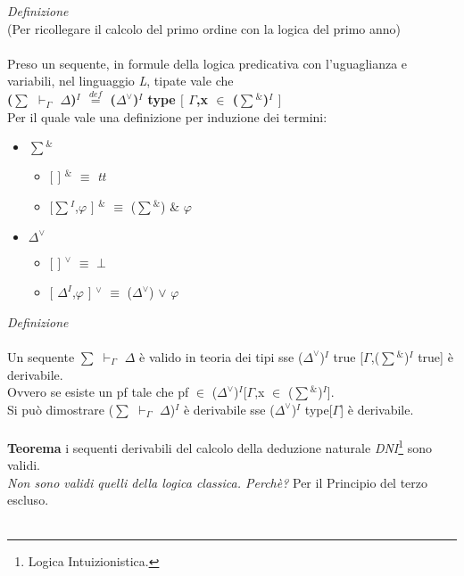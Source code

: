 \noindent \textit{Definizione}\\
(Per ricollegare il calcolo del primo ordine con la logica del primo anno)\\\\
\noindent 
Preso un sequente, in formule della logica predicativa con l'uguaglianza  e variabili, nel linguaggio \textit{L}, tipate vale che\\
\textbf{({\scriptsize$\sum$} $\vdash_\Gamma$ $\Delta$)$^I$ ${\overset{\mathit{def}}{=}}$ ($\Delta^\vee$)$^I$ type $[$ $\Gamma$,x $\in$ ({\scriptsize$\sum$}$^\&$)$^I$ $]$}\\
Per il quale vale una definizione per induzione dei termini:
\begin{itemize}
\item {\scriptsize$\sum$}$^\&$
\begin{itemize}
\item $[$ $]$ $^\&$ $\equiv$ \textit{tt}
\item $[${\scriptsize$\sum$}$^I$,$\varphi$ $]$ $^\&$ $\equiv$ ({\scriptsize$\sum$}$^\&$) \& $\varphi$
\end{itemize}
\item $\Delta^\vee$
\begin{itemize}
\item $[$ $]$ $^\vee$ $\equiv$ \textit{$\bot$}
\item $[$ $\Delta^I$,$\varphi$ $]$ $^\vee$ $\equiv$ ($\Delta^\vee$) $\vee$ $\varphi$
\end{itemize}
\end{itemize}
\noindent
\newpage
\noindent \textit{Definizione}\\\\
\noindent Un sequente {\scriptsize$\sum$} $\vdash_\Gamma$ $\Delta$ \`e valido in teoria dei tipi sse ($\Delta^\vee$)$^I$ true [$\Gamma$,({\scriptsize$\sum$}$^\&$)$^I$ true] \`e derivabile.\\
Ovvero se esiste un pf tale che pf $\in$ ($\Delta^\vee$)$^I$[$\Gamma$,x $\in$ ({\scriptsize$\sum$}$^\&$)$^I$].\\
Si pu\`o dimostrare ({\scriptsize$\sum$} $\vdash_\Gamma$ $\Delta$)$^I$ \`e derivabile sse ($\Delta^\vee$)$^I$ type[$\Gamma$] \`e derivabile.
\\\\
\noindent
\textbf{Teorema} i sequenti derivabili del calcolo della deduzione naturale \textit{DNI}\footnote{Logica Intuizionistica.} sono validi.\\
\textit{Non sono validi quelli della logica classica. Perch\`e?} Per il Principio del terzo escluso.\\\\
